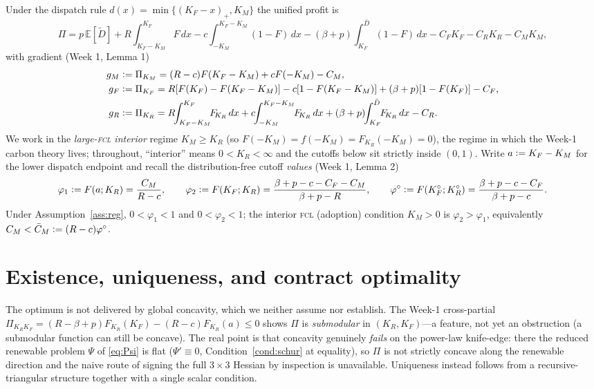 \documentclass[11pt,reqno]{amsart}
\theoremstyle{plain}
\theoremstyle{definition}
\theoremstyle{remark}
\newcommand{\KR}{K_R}
\newcommand{\KF}{K_F}
\newcommand{\KM}{K_M}
\newcommand{\KRo}{K_R^{\circ}}
\newcommand{\KFo}{K_F^{\circ}}
\newcommand{\Dbar}{\bar D}
\newcommand{\CM}{C_M}
\newcommand{\CF}{C_F}
\newcommand{\CR}{C_R}
\newcommand{\CMbar}{\bar C_M}
\newcommand{\bp}{\beta+p}
\newcommand{\FKR}{F_{\!\KR}}
\newcommand{\E}{\mathbb{E}}
\newcommand{\eqdef}{\vcentcolon=}
\begin{document}
Under the dispatch rule $d(x)=\min\{(\KF-x)_+,\KM\}$ the unified profit is
\begin{equation}\label{eq:profit}
  \Pi=p\,\E[\tilde D]
  +R\!\!\int_{\KF-\KM}^{\KF}\!\!\!F\,dx
  -c\!\!\int_{-\KM}^{\KF-\KM}\!\!\!(1-F)\,dx
  -(\bp)\!\!\int_{\KF}^{\Dbar}\!\!\!(1-F)\,dx
  -\CF\KF-\CR\KR-\CM\KM ,
\end{equation}
with gradient (Week 1, Lemma 1)
\begin{align}
  g_M&\eqdef\Pi_{\KM}=(R-c)F(\KF-\KM)+cF(-\KM)-\CM,\label{eq:gM}\\
  g_F&\eqdef\Pi_{\KF}=R[F(\KF)-F(\KF-\KM)]-c[1-F(\KF-\KM)]+(\bp)[1-F(\KF)]-\CF,\label{eq:gF}\\
  g_R&\eqdef\Pi_{\KR}=R\!\!\int_{\KF-\KM}^{\KF}\!\!\FKR\,dx
     +c\!\!\int_{-\KM}^{\KF-\KM}\!\!\FKR\,dx+(\bp)\!\!\int_{\KF}^{\Dbar}\!\!\FKR\,dx-\CR.\label{eq:gR}
\end{align}
We work in the \emph{large-\textsc{fcl} interior} regime $\KM\ge\KR$ (so
$F(-\KM)=f(-\KM)=\FKR(-\KM)=0$), the regime in which the Week-1 carbon theory
lives; throughout, ``interior'' means $0<\KR<\infty$ and the cutoffs below sit
strictly inside $(0,1)$. Write $a\eqdef\KF-\KM$ for the lower dispatch endpoint
and recall the distribution-free cutoff \emph{values} (Week 1, Lemma 2)
\begin{equation}\label{eq:cut}
  \varphi_1\eqdef F(a;\KR)=\frac{\CM}{R-c},\qquad
  \varphi_2\eqdef F(\KF;\KR)=\frac{\bp-c-\CF-\CM}{\bp-R},\qquad
  \varphi^{\circ}\eqdef F(\KFo;\KRo)=\frac{\bp-c-\CF}{\bp-c}.
\end{equation}
Under Assumption~\ref{ass:reg}, $0<\varphi_1<1$ and $0<\varphi_2<1$; the interior
\textsc{fcl} (adoption) condition $\KM>0$ is $\varphi_2>\varphi_1$, equivalently
$\CM<\CMbar\eqdef(R-c)\varphi^{\circ}$.

\section{Existence, uniqueness, and contract optimality}\label{sec:unique}

The optimum is not delivered by global concavity, which we neither assume nor
establish. The Week-1 cross-partial
$\Pi_{\KR\KF}=(R-\bp)\FKR(\KF)-(R-c)\FKR(a)\le0$ shows $\Pi$ is \emph{submodular}
in $(\KR,\KF)$---a feature, not yet an obstruction (a submodular function can still
be concave). The real point is that concavity genuinely \emph{fails} on the
power-law knife-edge: there the reduced renewable problem $\Psi$ of
\eqref{eq:Psi} is flat ($\Psi'\equiv0$, Condition~\ref{cond:schur} at equality),
so $\Pi$ is not strictly concave along the renewable direction and the naive route
of signing the full $3\times3$ Hessian by inspection is unavailable. Uniqueness
instead follows from a recursive-triangular structure together with a single
scalar condition.
\end{document}
